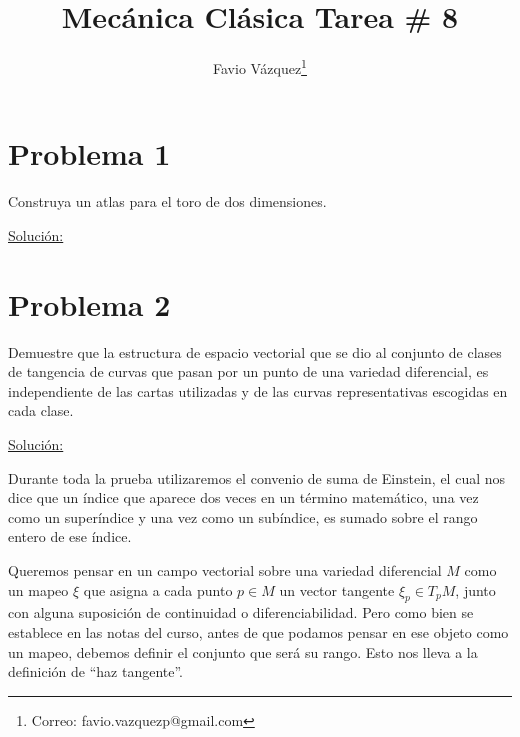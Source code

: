 \documentclass[a4paper,10pt]{article}
\title{Mecánica Clásica Tarea \# 8}
\author{Favio Vázquez\thanks{Correo: favio.vazquezp@gmail.com}}\affil{Instituto de Ciencias Nucleares. Universidad Nacional Autónoma de México.}
\date{}
\numberwithin{equation}{section}
\begin{document}
\makeatletter
\def\@maketitle{%
  \newpage
  \null
  \vskip 2em%
  \begin{center}%
  \let \footnote \thanks
    {\Large\bfseries \@title \par}%
    \vskip 1.5em%
    {\normalsize
      \lineskip .5em%
      \begin{tabular}[t]{c}%
        \@author
      \end{tabular}\par}%
    \vskip 1em%
    {\normalsize \@date}%
  \end{center}%
  \par
  \vskip 1.5em}
\makeatother

\maketitle

\section{Problema 1}

Construya un atlas para el toro de dos dimensiones.

\vspace{.3cm}

\underline{Solución:} \vspace{.3cm}

\section{Problema 2}

Demuestre que la estructura de espacio vectorial que se dio al conjunto de clases de 
tangencia de curvas que pasan por un punto de una variedad diferencial, es independiente 
de las cartas utilizadas y de las curvas representativas escogidas en cada clase.

\vspace{.3cm}

\underline{Solución:} \vspace{.3cm}

Durante toda la prueba utilizaremos el convenio de suma de Einstein, el cual nos dice 
que un índice que aparece dos veces en un término matemático, una vez como un 
superíndice y una vez como un subíndice, es sumado sobre el rango entero de ese 
índice. 

\vspace{.3cm}

Queremos pensar en un campo vectorial sobre una variedad diferencial $M$ como un 
mapeo $\xi$ que asigna a cada punto $p \in M$ un vector tangente $\xi_p \in T_p M$, 
junto con alguna suposición de continuidad o diferenciabilidad. Pero como bien 
se establece en las notas del curso, antes de que podamos pensar en ese objeto 
como un mapeo, debemos definir el conjunto que será su rango. Esto nos lleva a la 
definición de ``haz tangente''.
\end{document}
